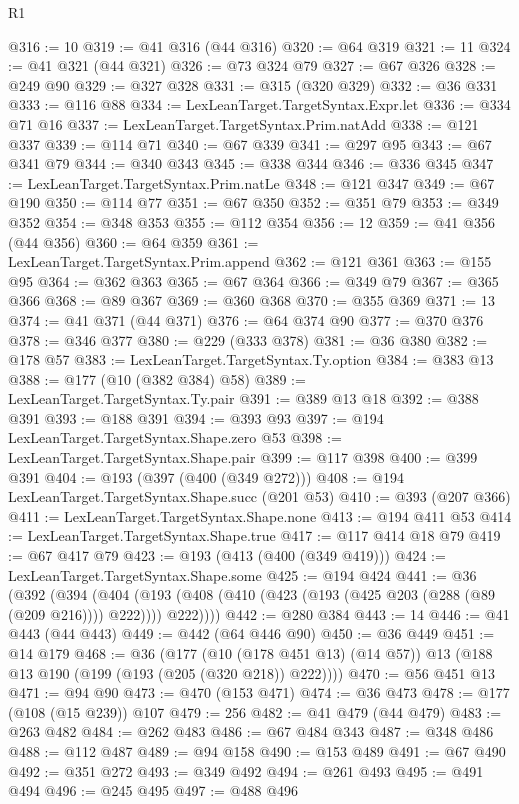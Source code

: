 \begin{lexlean}{R1}
\begin{coremodule}
@316 := 10
@319 := @41 @316 (@44 @316)
@320 := @64 @319
@321 := 11
@324 := @41 @321 (@44 @321)
@326 := @73 @324 @79
@327 := @67 @326
@328 := @249 @90
@329 := @327 @328
@331 := @315 (@320 @329)
@332 := @36 @331
@333 := @116 @88
@334 := LexLeanTarget.TargetSyntax.Expr.let
@336 := @334 @71 @16
@337 := LexLeanTarget.TargetSyntax.Prim.natAdd
@338 := @121 @337
@339 := @114 @71
@340 := @67 @339
@341 := @297 @95
@343 := @67 @341 @79
@344 := @340 @343
@345 := @338 @344
@346 := @336 @345
@347 := LexLeanTarget.TargetSyntax.Prim.natLe
@348 := @121 @347
@349 := @67 @190
@350 := @114 @77
@351 := @67 @350
@352 := @351 @79
@353 := @349 @352
@354 := @348 @353
@355 := @112 @354
@356 := 12
@359 := @41 @356 (@44 @356)
@360 := @64 @359
@361 := LexLeanTarget.TargetSyntax.Prim.append
@362 := @121 @361
@363 := @155 @95
@364 := @362 @363
@365 := @67 @364
@366 := @349 @79
@367 := @365 @366
@368 := @89 @367
@369 := @360 @368
@370 := @355 @369
@371 := 13
@374 := @41 @371 (@44 @371)
@376 := @64 @374 @90
@377 := @370 @376
@378 := @346 @377
@380 := @229 (@333 @378)
@381 := @36 @380
@382 := @178 @57
@383 := LexLeanTarget.TargetSyntax.Ty.option
@384 := @383 @13
@388 := @177 (@10 (@382 @384) @58)
@389 := LexLeanTarget.TargetSyntax.Ty.pair
@391 := @389 @13 @18
@392 := @388 @391
@393 := @188 @391
@394 := @393 @93
@397 := @194 LexLeanTarget.TargetSyntax.Shape.zero @53
@398 := LexLeanTarget.TargetSyntax.Shape.pair
@399 := @117 @398
@400 := @399 @391
@404 := @193 (@397 (@400 (@349 @272)))
@408 := @194 LexLeanTarget.TargetSyntax.Shape.succ (@201 @53)
@410 := @393 (@207 @366)
@411 := LexLeanTarget.TargetSyntax.Shape.none
@413 := @194 @411 @53
@414 := LexLeanTarget.TargetSyntax.Shape.true
@417 := @117 @414 @18 @79
@419 := @67 @417 @79
@423 := @193 (@413 (@400 (@349 @419)))
@424 := LexLeanTarget.TargetSyntax.Shape.some
@425 := @194 @424
@441 := @36
    (@392
      (@394
        (@404 (@193 (@408 (@410 (@423 (@193 (@425 @203 (@288 (@89 (@209 @216)))) @222)))) @222))))
@442 := @280 @384
@443 := 14
@446 := @41 @443 (@44 @443)
@449 := @442 (@64 @446 @90)
@450 := @36 @449
@451 := @14 @179
@468 := @36
    (@177 (@10 (@178 @451 @13) (@14 @57)) @13 (@188 @13 @190 (@199 (@193 (@205 (@320 @218)) @222))))
@470 := @56 @451 @13
@471 := @94 @90
@473 := @470 (@153 @471)
@474 := @36 @473
@478 := @177 (@108 (@15 @239)) @107
@479 := 256
@482 := @41 @479 (@44 @479)
@483 := @263 @482
@484 := @262 @483
@486 := @67 @484 @343
@487 := @348 @486
@488 := @112 @487
@489 := @94 @158
@490 := @153 @489
@491 := @67 @490
@492 := @351 @272
@493 := @349 @492
@494 := @261 @493
@495 := @491 @494
@496 := @245 @495
@497 := @488 @496

\end{coremodule}
\end{lexlean}
